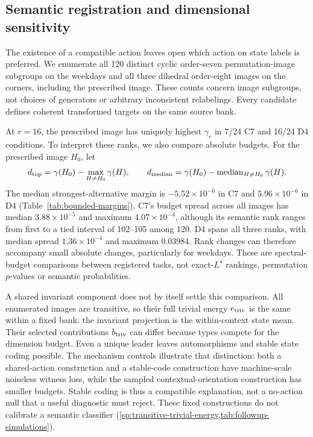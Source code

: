 \subsection{Semantic registration and dimensional sensitivity}
\label{sec:registration-sensitivity}
The existence of a compatible action leaves open which action on state labels is preferred. We enumerate all 120 distinct cyclic order-seven permutation-image subgroups on the weekdays and all three dihedral order-eight images on the corners, including the prescribed image. These counts concern image subgroups, not choices of generators or arbitrary inconsistent relabelings. Every candidate defines coherent transformed targets on the same source bank.

At $r=16$, the prescribed image has uniquely highest $\gamma_r$ in 7/24 C7 and 16/24 D4 conditions. To interpret these ranks, we also compare absolute budgets. For the prescribed image $H_0$, let
\[
 d_{\rm top}=\gamma(H_0)-\max_{H\ne H_0}\gamma(H),\qquad
 d_{\rm median}=\gamma(H_0)-\operatorname{median}_{H\ne H_0}\gamma(H).
\]
The median strongest-alternative margin is $-5.52\times10^{-6}$ in C7 and $5.96\times10^{-6}$ in D4 (Table~\ref{tab:bounded-margins}). C7's budget spread across all images has median $3.88\times10^{-5}$ and maximum $4.07\times10^{-4}$, although its semantic rank ranges from first to a tied interval of 102--105 among 120. D4 spans all three ranks, with median spread $1.36\times10^{-4}$ and maximum $0.03984$. Rank changes can therefore accompany small absolute changes, particularly for weekdays. These are spectral-budget comparisons between registered tasks, not exact-$L^\star$ rankings, permutation $p$-values or semantic probabilities.

\begin{table}[t]
\centering\small

\caption{Registration margins at $r=16$ in all 24 fixed conditions per domain. Positive values favor the prescribed image over the strongest or median alternative. U/T/B counts unique leading, tied leading and behind under the recorded pairwise tolerance. The margins measure spectral-budget differences between coherent target actions.}
\label{tab:bounded-margins}
\end{table}

A shared invariant component does not by itself settle this comparison. All enumerated images are transitive, so their full trivial energy $e_{\rm triv}$ is the same within a fixed bank: the invariant projection is the within-context state mean. Their selected contributions $b_{\rm triv}$ can differ because types compete for the dimension budget. Even a unique leader leaves automorphisms and stable state coding possible. The mechanism controls illustrate that distinction: both a shared-action construction and a stable-code construction have machine-scale noiseless witness loss, while the sampled contextual-orientation construction has smaller budgets. Stable coding is thus a compatible explanation, not a no-action null that a useful diagnostic must reject. These fixed constructions do not calibrate a semantic classifier (\cref{sp:transitive-trivial-energy,tab:followup-simulations}).

